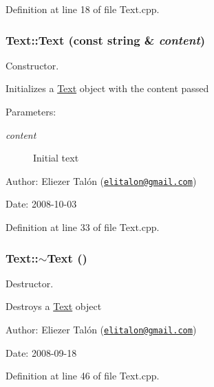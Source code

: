 Definition at line 18 of file Text.cpp.\hypertarget{class_text_e768cfd2aa0b9baaf25dffcb717ae314}{
\subsubsection[Text]{\setlength{\rightskip}{0pt plus 5cm}Text::Text (const string \& {\em content})}}
\label{class_text_e768cfd2aa0b9baaf25dffcb717ae314}


Constructor. 

Initializes a \hyperlink{class_text}{Text} object with the content passed

\begin{Desc}
\item[Parameters:]
\begin{description}
\item[{\em content}]Initial text\end{description}
\end{Desc}
\begin{Desc}
\item[Author:]Eliezer Talón (\href{mailto:elitalon@gmail.com}{\tt elitalon@gmail.com}) \end{Desc}
\begin{Desc}
\item[Date:]2008-10-03 \end{Desc}


Definition at line 33 of file Text.cpp.\hypertarget{class_text_2d49e5c280e205125b149f7777ae30c7}{
\subsubsection[$\sim$Text]{\setlength{\rightskip}{0pt plus 5cm}Text::$\sim$Text ()}}
\label{class_text_2d49e5c280e205125b149f7777ae30c7}


Destructor. 

Destroys a \hyperlink{class_text}{Text} object

\begin{Desc}
\item[Author:]Eliezer Talón (\href{mailto:elitalon@gmail.com}{\tt elitalon@gmail.com}) \end{Desc}
\begin{Desc}
\item[Date:]2008-09-18 \end{Desc}


Definition at line 46 of file Text.cpp.

